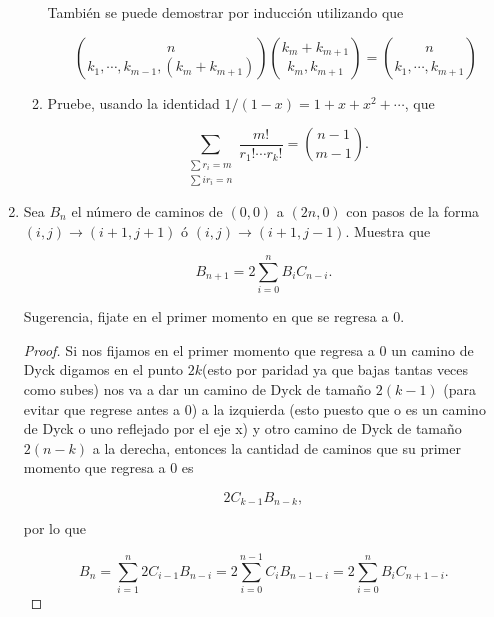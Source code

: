 \documentclass[letterpaper]{article}
\newcommand{\1}{\mathbbm{1}}
\begin{document}
\begin{enumerate}
\begin{enumerate}
			También se puede demostrar por inducción utilizando que

			\[\binom{n}{k_1,\cdots,k_{m-1},(k_m+k_{m+1})}\binom{k_m+k_{m+1}}{k_m,k_{m+1}} = \binom{n}{k_1,\cdots,k_{m+1}}\]
			
			\item Pruebe, usando la identidad $1/(1-x) = 1 + x + x^2+ \cdots$, que
			
			\[\sum_{\substack{\sum r_i=m \\ \sum ir_i=n}}\frac{m!}{r_1!\cdots r_k!}=\binom{n-1}{m-1}.\]
		\end{enumerate}

		\item Sea $B_n$ el n\'umero de caminos de $(0,0)$ a $(2n,0)$ con pasos de la forma $(i,j)\to(i+1,j+1)$ \'o  $(i,j)\to(i+1,j-1)$. Muestra que 
		
		\[B_{n+1}=2\sum^n_{i=0} B_iC_{n-i}.\]
		
		Sugerencia, fijate en el primer momento en que se regresa a 0.

		\begin{proof}
			Si nos fijamos en el primer momento que regresa a $0$ un camino de Dyck digamos en el punto $2k$(esto por paridad ya que bajas tantas veces como subes) nos va a dar un camino de Dyck de tamaño $2(k-1)$ (para evitar que regrese antes a 0) a la izquierda (esto puesto que o es un camino de Dyck o uno reflejado por el eje x) y otro camino de Dyck de tamaño $2(n-k)$ a la derecha, entonces la cantidad de caminos que su primer momento que regresa a 0 es

			\[2C_{k-1}B_{n-k},\]

			por lo que

			\[B_{n} = \sum_{i=1}^n2C_{i-1}B_{n-i} = 2\sum_{i=0}^{n-1} C_{i}B_{n-1-i} = 2\sum_{i=0}^nB_iC_{n+1-i}.\]
			
		\end{proof}

    \end{enumerate}

	
\end{document}
